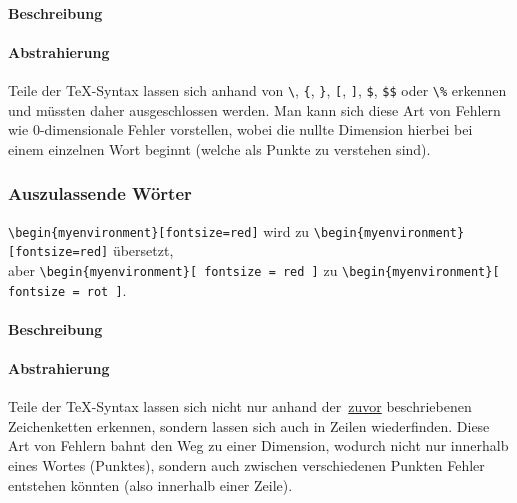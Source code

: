 \paragraph*{Beschreibung}
\paragraph*{Abstrahierung}
Teile der \TeX{}-Syntax lassen sich anhand von \verb|\|, \verb|{|, \verb|}|, \verb|[|, \verb|]|, \verb|$|, \verb|$$| oder \verb|\%| erkennen und müssten daher ausgeschlossen werden. Man kann sich diese Art von Fehlern wie 0-dimensionale Fehler vorstellen, wobei die nullte Dimension hierbei bei einem einzelnen Wort beginnt (welche als Punkte zu verstehen sind).

\subsubsection{Auszulassende Wörter}\label{problems:dim1}%
\verb|\begin{myenvironment}[fontsize=red]| wird zu \verb|\begin{myenvironment}[fontsize=red]| übersetzt,\\aber \verb|\begin{myenvironment}[ fontsize = red ]| zu \verb|\begin{myenvironment}[ fontsize = rot ]|.
\paragraph*{Beschreibung}
\paragraph*{Abstrahierung}
Teile der \TeX-Syntax lassen sich nicht nur anhand der~\hyperref[problems:unexpectedCharacters]{zuvor} beschriebenen Zeichenketten erkennen, sondern lassen sich auch in Zeilen wiederfinden. Diese Art von Fehlern bahnt den Weg zu einer Dimension, wodurch nicht nur innerhalb eines Wortes (Punktes), sondern auch zwischen verschiedenen Punkten Fehler entstehen könnten (also innerhalb einer Zeile).

\newpage

